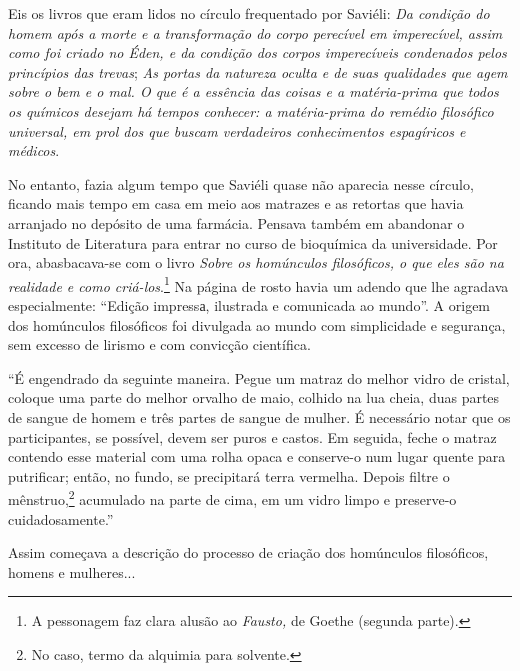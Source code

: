 Eis os livros que eram lidos no círculo frequentado por Saviéli:
\emph{Da condição do homem após a morte e a transformação do corpo
perecível em imperecível, assim como foi criado no Éden, e da condição
dos corpos imperecíveis condenados pelos princípios das trevas};
\emph{As portas da natureza oculta e de suas qualidades que agem sobre o
bem e o mal. O que é a essência das coisas e a matéria-prima que todos
os químicos desejam há tempos conhecer: a matéria-prima do remédio
filosófico universal, em prol dos que buscam verdadeiros conhecimentos
espagíricos e médicos}.

No entanto, fazia algum tempo que Saviéli quase não aparecia nesse
círculo, ficando mais tempo em casa em meio aos matrazes e as retortas
que havia arranjado no depósito de uma farmácia. Pensava também em
abandonar o Instituto de Literatura para entrar no curso de bioquímica
da universidade. Por ora, abasbacava-se com o livro \emph{Sobre os
homúnculos filosóficos, o que eles são na realidade e como
criá-los}.\footnote{A pessonagem faz clara alusão ao \emph{Fausto,} de
  Goethe (segunda parte).} Na página de rosto havia um adendo que lhe
agradava especialmente: ``Edição impressа, ilustrada e comunicada ao
mundo''. A origem dos homúnculos filosóficos foi divulgada ao mundo com
simplicidade e segurança, sem excesso de lirismo e com convicção
científica.

``É engendrado da seguinte maneira. Pegue um matraz do melhor vidro de
cristal, coloque uma parte do melhor orvalho de maio, colhido na lua
cheia, duas partes de sangue de homem e três partes de sangue de mulher.
É necessário notar que os participantes, se possível, devem ser puros e
castos. Em seguida, feche o matraz contendo esse material com uma rolha
opaca e conserve-o num lugar quente para putrificar; então, no fundo, se
precipitará terra vermelha. Depois filtre o mênstruo,\footnote{No caso,
  termo da alquimia para solvente.} acumulado na parte de cima, em um
vidro limpo e preserve-o cuidadosamente.''

Assim começava a descrição do processo de criação dos homúnculos
filosóficos, homens e mulheres...

